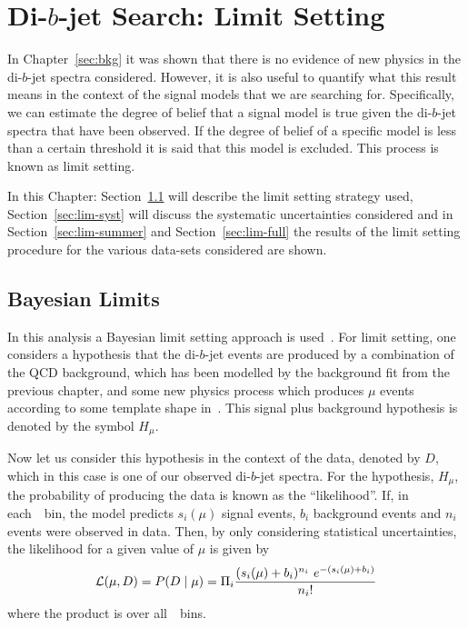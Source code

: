 \chapter{Di-$b$-jet Search: Limit Setting}
\label{sec:lim}


In Chapter~\ref{sec:bkg} it was shown that there is no evidence of new physics in the di-$b$-jet spectra considered.
However, it is also useful to quantify what this result means in the context
of the signal models that we are searching for.
Specifically, we can estimate the degree of belief that a signal model is true given the di-$b$-jet spectra that have been observed.
If the degree of belief of a specific model is less than a certain threshold it is said that this model is excluded.
This process is known as limit setting.

In this Chapter:
Section~\ref{sec:lim-strat} will describe the limit setting strategy used,
Section~\ref{sec:lim-syst} will discuss the systematic uncertainties considered
and in Section~\ref{sec:lim-summer} and Section~\ref{sec:lim-full}
the results of the limit setting procedure for the various data-sets considered are shown.

\section{Bayesian Limits}
\label{sec:lim-strat}

In this analysis a Bayesian limit setting approach is used~\cite{lim-bayes}.
For limit setting, one considers a hypothesis that the di-$b$-jet events are produced by a combination of 
the QCD background, which has been modelled by the background fit from the previous chapter,
and some new physics process 
which produces $\mu$ events according to some template shape in~\mjj.
This signal plus background hypothesis is denoted by the symbol $H_\mu$.

Now let us consider this hypothesis in the context of the data, denoted by $D$,
which in this case is one of our observed di-$b$-jet spectra.
For the hypothesis, $H_\mu$, the probability of producing the data is known as the ``likelihood''.
If, in each~\mjj~bin, the model predicts
$s_i(\mu)$ signal events, $b_i$ background events and $n_i$ events were observed in data.
Then, by only considering statistical uncertainties, the likelihood for a given value of $\mu$ is given by
\begin{equation}
  \mathcal{L} (\mu,D) = P(D \mid \mu) =  \Pi_i \frac{(s_i(\mu)+b_i)^{n_i}~e^{-(s_i(\mu)+b_i)}}{n_i!}
\end{equation}
where the product is over all~\mjj~bins.

